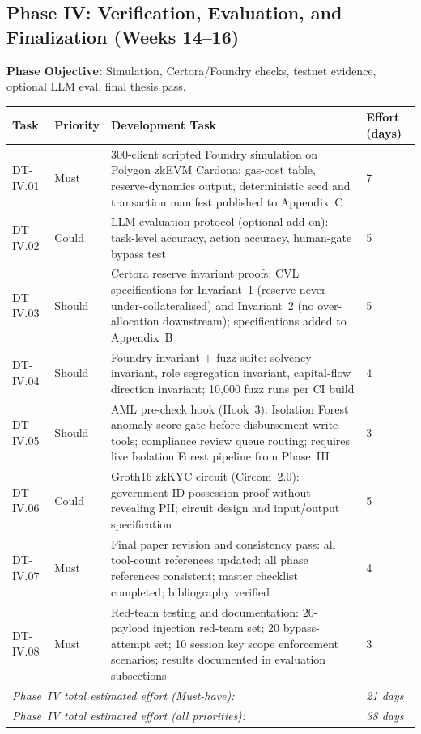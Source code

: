 \documentclass[12pt, a4paper]{report}
\newcommand{\tableheadcolor}{\rowcolor{TableHeadBg}}
\begin{document}
\vspace{2pt}

\subsection{Phase IV: Verification, Evaluation, and Finalization (Weeks 14--16)}

\textbf{Phase Objective:} Simulation, Certora/Foundry checks, testnet evidence, optional LLM eval, final thesis pass.

\begin{table}[H]
\centering
\begin{tabular}{p{1.8cm}p{1.8cm}p{7.5cm}p{1.5cm}}
\toprule
\tableheadcolor
\textbf{Task} & \textbf{Priority} & \textbf{Development Task} & \textbf{Effort (days)} \\
\midrule
DT-IV.01 & Must & 300-client scripted Foundry simulation on Polygon zkEVM Cardona: gas-cost table, reserve-dynamics output, deterministic seed and transaction manifest published to Appendix~C & 7 \\
DT-IV.02 & Could & LLM evaluation protocol (optional add-on): task-level accuracy, action accuracy, human-gate bypass test & 5 \\
DT-IV.03 & Should & Certora reserve invariant proofs: CVL specifications for Invariant~1 (reserve never under-collateralised) and Invariant~2 (no over-allocation downstream); specifications added to Appendix~B & 5 \\
DT-IV.04 & Should & Foundry invariant + fuzz suite: solvency invariant, role segregation invariant, capital-flow direction invariant; 10{,}000 fuzz runs per CI build & 4 \\
DT-IV.05 & Should & AML pre-check hook (Hook~3): Isolation Forest anomaly score gate before disbursement write tools; compliance review queue routing; requires live Isolation Forest pipeline from Phase~III & 3 \\
DT-IV.06 & Could & Groth16 zkKYC circuit (Circom~2.0): government-ID possession proof without revealing PII; circuit design and input/output specification & 5 \\
DT-IV.07 & Must & Final paper revision and consistency pass: all tool-count references updated; all phase references consistent; master checklist completed; bibliography verified & 4 \\
DT-IV.08 & Must & Red-team testing and documentation: 20-payload injection red-team set; 20 bypass-attempt set; 10 session key scope enforcement scenarios; results documented in evaluation subsections & 3 \\
\multicolumn{3}{l}{\textit{Phase~IV total estimated effort (Must-have):}} & \textit{21 days} \\
\multicolumn{3}{l}{\textit{Phase~IV total estimated effort (all priorities):}} & \textit{38 days} \\
\bottomrule
\end{tabular}
\end{table}
\end{document}
